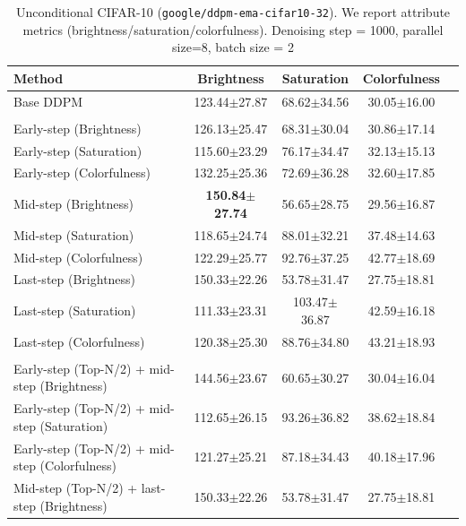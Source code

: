 \documentclass{article}
\begin{document}
\begin{table}[t]
\centering
\caption{Unconditional CIFAR-10 (\texttt{google/ddpm-ema-cifar10-32}). We report attribute metrics (brightness/saturation/colorfulness). Denoising step = 1000, parallel size=8, batch size = 2}
\setlength{\tabcolsep}{6pt}
\renewcommand{\arraystretch}{1.15}
\begin{tabular}{lcccc}\toprule
\textbf{Method} & \textbf{Brightness} & \textbf{Saturation} & \textbf{Colorfulness} \\
\midrule
Base DDPM & 123.44$\pm$27.87 & 68.62$\pm$34.56 & 30.05$\pm$16.00 \\
\midrule
\rowcolor{gray!15}
\multicolumn{4}{c}{\textit{Best-of-$N$}} \\
Early-step (Brightness) & 126.13$\pm$25.47 & 68.31$\pm$30.04 & 30.86$\pm$17.14 \\
Early-step (Saturation) & 115.60$\pm$23.29 & 76.17$\pm$34.47 & 32.13$\pm$15.13 \\
Early-step (Colorfulness) & 132.25$\pm$25.36 & 72.69$\pm$36.28 & 32.60$\pm$17.85 \\
\midrule
Mid-step (Brightness) & \textbf{150.84$\pm$27.74} & 56.65$\pm$28.75 & 29.56$\pm$16.87 \\
Mid-step (Saturation) & 118.65$\pm$24.74 & 88.01$\pm$32.21 & 37.48$\pm$14.63 \\
Mid-step (Colorfulness) & 122.29$\pm$25.77 & 92.76$\pm$37.25 & 42.77$\pm$18.69 \\
\midrule
Last-step (Brightness) & 150.33$\pm$22.26 & 53.78$\pm$31.47 & 27.75$\pm$18.81 \\
Last-step (Saturation) & 111.33$\pm$23.31 & 103.47$\pm$36.87 & 42.59$\pm$16.18 \\
Last-step (Colorfulness) & 120.38$\pm$25.30 & 88.76$\pm$34.80 & 43.21$\pm$18.93 \\
\midrule
\rowcolor{gray!15}
\multicolumn{4}{c}{\textit{FK-Steering---using RankerReward as potential}} \\
Early-step (Top-N/2) + mid-step (Brightness)& 144.56$\pm$23.67 & 60.65$\pm$30.27 & 30.04$\pm$16.04 \\
Early-step (Top-N/2) + mid-step (Saturation) & 112.65$\pm$26.15 & 93.26$\pm$36.82 & 38.62$\pm$18.84 \\
Early-step (Top-N/2) + mid-step (Colorfulness) & 121.27$\pm$25.21 & 87.18$\pm$34.43 & 40.18$\pm$17.96 \\
\midrule
Mid-step (Top-N/2) + last-step (Brightness) & 150.33$\pm$22.26 & 53.78$\pm$31.47 & 27.75$\pm$18.81 \\

\end{tabular}
\end{table}
\end{document}
